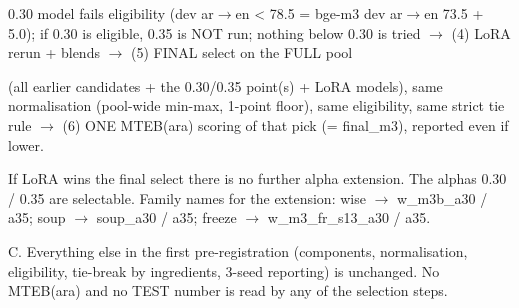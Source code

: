 {0.30 model fails eligibility (dev ar$\to$en < 78.5 = bge-m3 dev ar$\to$en 73.5 + 5.0); if 0.30 is eligible, 0.35 is NOT run; nothing below 0.30 is tried  $\to$  (4) LoRA rerun + blends  $\to$  (5) FINAL select on the FULL pool

(all earlier candidates + the 0.30/0.35 point(s) + LoRA models), same normalisation (pool-wide min-max, 1-point floor), same eligibility, same strict tie rule  $\to$  (6) ONE MTEB(ara) scoring of that pick (= final\_m3), reported even if lower.

If LoRA wins the final select there is no further alpha extension. The alphas 0.30 / 0.35 are selectable. Family names for the extension: wise $\to$ w\_m3b\_a30 / a35; soup $\to$ soup\_a30 / a35; freeze $\to$ w\_m3\_fr\_s13\_a30 / a35.

C. Everything else in the first pre-registration (components, normalisation, eligibility, tie-break by ingredients, 3-seed reporting) is unchanged. No MTEB(ara) and no TEST number is read by any of the selection steps.\par}

